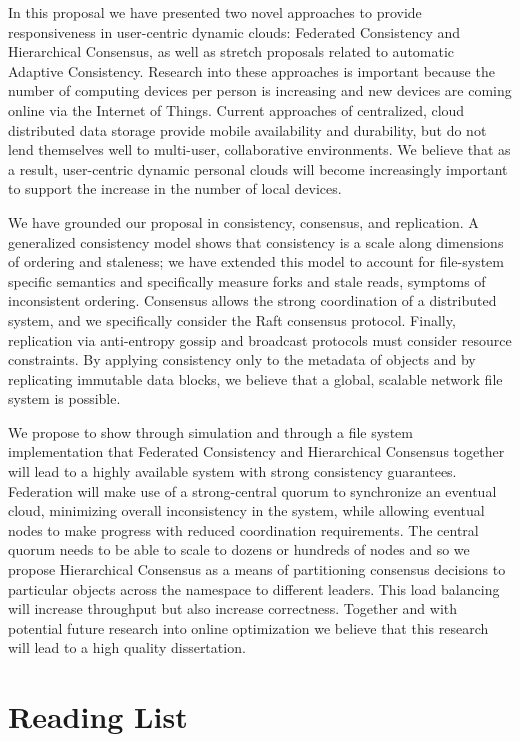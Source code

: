 \documentclass{article}
\begin{document}
In this proposal we have presented two novel approaches to provide responsiveness in user-centric dynamic clouds: Federated Consistency and Hierarchical Consensus, as well as stretch proposals related to automatic Adaptive Consistency. Research into these approaches is important because the number of computing devices per person is increasing and new devices are coming online via the Internet of Things. Current approaches of centralized, cloud distributed data storage provide mobile availability and durability, but do not lend themselves well to multi-user, collaborative environments. We believe that as a result, user-centric dynamic personal clouds will become increasingly important to support the increase in the number of local devices.

We have grounded our proposal in consistency, consensus, and replication. A generalized consistency model shows that consistency is a scale along dimensions of ordering and staleness; we have extended this model to account for file-system specific semantics and specifically measure forks and stale reads, symptoms of inconsistent ordering. Consensus allows the strong coordination of a distributed system, and we specifically consider the Raft consensus protocol. Finally, replication via anti-entropy gossip and broadcast protocols must consider resource constraints. By applying consistency only to the metadata of objects and by replicating immutable data blocks, we believe that a global, scalable network file system is possible.

We propose to show through simulation and through a file system implementation that Federated Consistency and Hierarchical Consensus together will lead to a highly available system with strong consistency guarantees. Federation will make use of a strong-central quorum to synchronize an eventual cloud, minimizing overall inconsistency in the system, while allowing eventual nodes to make progress with reduced coordination requirements. The central quorum needs to be able to scale to dozens or hundreds of nodes and so we propose Hierarchical Consensus as a means of partitioning consensus decisions to particular objects across the namespace to different leaders. This load balancing will increase throughput but also increase correctness. Together and with potential future research into online optimization we believe that this research will lead to a high quality dissertation.

\newpage

\appendix
\section{Reading List}
\label{app:readinglist}
\end{document}
